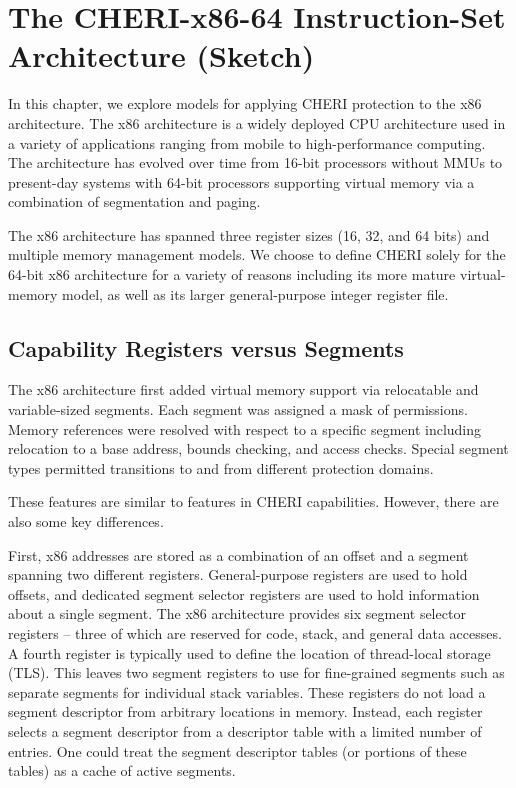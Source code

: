 \chapter{The CHERI-x86-64 Instruction-Set Architecture (Sketch)}
\label{chap:cheri-x86-64}


In this chapter, we explore models for applying CHERI protection to the x86
architecture.
The x86 architecture is a widely deployed CPU architecture used in a
variety of applications ranging from mobile to high-performance computing.
The architecture has evolved over time from 16-bit processors without
MMUs to present-day systems with 64-bit processors supporting virtual
memory via a combination of segmentation and paging.

The x86 architecture has spanned three register sizes (16, 32, and
64 bits) and multiple memory management models.  We choose to define
CHERI solely for the 64-bit x86 architecture for a variety of reasons
including its more mature virtual-memory model, as well as its larger
general-purpose integer register file.

\section{Capability Registers versus Segments}

The x86 architecture first added virtual memory support via
relocatable and variable-sized segments.  Each segment was assigned a
mask of permissions.  Memory references were resolved with respect to a
specific segment including relocation to a base address, bounds
checking, and access checks.  Special segment types permitted transitions
to and from different protection domains.

These features are similar to features in CHERI capabilities.
However, there are also some key differences.

First, x86 addresses are stored as a combination of an offset and a
segment spanning two different registers.  General-purpose registers
are used to hold offsets, and dedicated segment selector registers are
used to hold information about a single segment.  The x86 architecture
provides six segment selector registers -- three of which are reserved
for code, stack, and general data accesses.  A fourth register is
typically used to define the location of thread-local storage (TLS).
This leaves two segment registers to use for fine-grained segments
such as separate segments for individual stack variables.  These
registers do not load a segment descriptor from arbitrary locations in
memory.  Instead, each register selects a segment descriptor from a
descriptor table with a limited number of entries.  One could treat
the segment descriptor tables (or portions of these tables) as a cache
of active segments.

